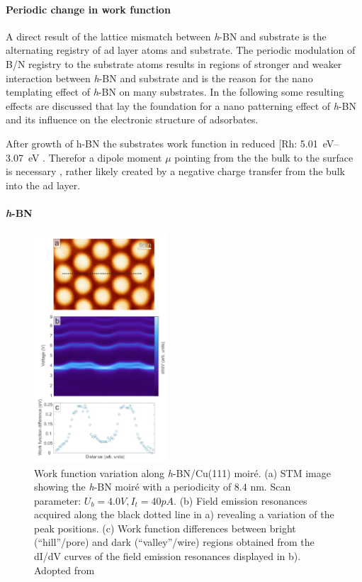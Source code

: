 \paragraph{Periodic change in work function}
A direct result of the lattice mismatch between \textit{h}-BN and substrate is the alternating registry of ad layer atoms and substrate. The periodic modulation of B/N registry to the substrate atoms results in regions of stronger and weaker interaction between \textit{h}-BN and substrate and is the reason for the nano templating effect of \textit{h}-BN on many substrates. 
In the following some resulting effects are discussed that lay the foundation for a nano patterning effect of \textit{h}-BN and its influence on the electronic structure of adsorbates.

After growth of h-BN the substrates work function in reduced [Rh: \SIrange{5.01}{3.07}{\eV} \cite{gomez_diaz_hexagonal_2013}. Therefor a dipole moment $\mu$ pointing from the the bulk to the surface is necessary \cite{roman_periodic_2013}, rather likely created by a negative charge transfer from the bulk into the ad layer.

\paragraph{\textit{h}-BN}
{%
	\parfillskip=0pt
	\parskip=0pt
	\par}
\begin{figure}\centering
	\includegraphics[width=5cm]{./images/h-BN-Cu(111)-wf-change}
	\caption{Work function variation along \textit{h}-BN/Cu(111) moiré. (a) STM image showing the \textit{h}-BN moir\'e with a periodicity of 8.4 nm. Scan parameter: $U_b= 4.0 V, I_t= 40 pA$. (b)	Field emission resonances acquired along the black dotted line in a) revealing a variation of the peak positions. (c) Work  function  differences  between bright  (“hill”/pore)  and  dark  (“valley”/wire)  regions obtained  from  the  dI/dV curves  of  the  field emission  resonances  displayed  in  b). Adopted from \cite{schwarz_corrugation_2017}}
	\label{fig:h-bn-cu-wf}
\end{figure}


